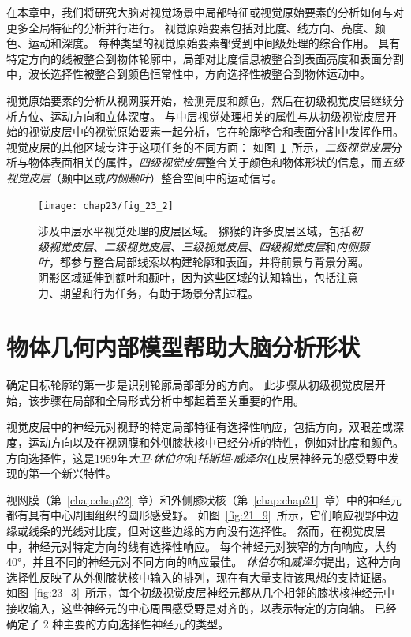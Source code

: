 在本章中，我们将研究大脑对视觉场景中局部特征或视觉原始要素的分析如何与对更多全局特征的分析并行进行。
视觉原始要素包括对比度、线方向、亮度、颜色、运动和深度。
每种类型的视觉原始要素都受到中间级处理的综合作用。
具有特定方向的线被整合到物体轮廓中，局部对比度信息被整合到表面亮度和表面分割中，波长选择性被整合到颜色恒常性中，方向选择性被整合到物体运动中。


视觉原始要素的分析从视网膜开始，检测亮度和颜色，然后在初级视觉皮层继续分析方位、运动方向和立体深度。
与中层视觉处理相关的属性与从初级视觉皮层开始的视觉皮层中的视觉原始要素一起分析，它在轮廓整合和表面分割中发挥作用。
视觉皮层的其他区域专注于这项任务的不同方面：
如图~\ref{fig:23_2}~所示，\textit{二级视觉皮层}分析与物体表面相关的属性，\textit{四级视觉皮层}整合关于颜色和物体形状的信息，而\textit{五级视觉皮层}（颞中区或\textit{内侧颞叶}）整合空间中的运动信号。


\begin{figure}[htbp]
	\centering
	\texttt{[image: chap23/fig\_23\_2]}
	\caption{涉及中层水平视觉处理的皮层区域。
		猕猴的许多皮层区域，包括\textit{初级视觉皮层}、\textit{二级视觉皮层}、\textit{三级视觉皮层}、\textit{四级视觉皮层}和\textit{内侧颞叶}，都参与整合局部线索以构建轮廓和表面，并将前景与背景分离。
		阴影区域延伸到额叶和颞叶，因为这些区域的认知输出，包括注意力、期望和行为任务，有助于场景分割过程。}
	\label{fig:23_2}
\end{figure}



\section{物体几何内部模型帮助大脑分析形状}

确定目标轮廓的第一步是识别轮廓局部部分的方向。
此步骤从初级视觉皮层开始，该步骤在局部和全局形式分析中都起着至关重要的作用。


视觉皮层中的神经元对视野的特定局部特征有选择性响应，包括方向，双眼差或深度，运动方向以及在视网膜和外侧膝状核中已经分析的特性，例如对比度和颜色。 
方向选择性，这是1959年\textit{大卫$\cdot$休伯尔}和\textit{托斯坦$\cdot$威泽尔}在皮层神经元的感受野中发现的第一个新兴特性。


视网膜（第~\ref{chap:chap22}~章）和外侧膝状核（第~\ref{chap:chap21}~章）中的神经元都有具有中心周围组织的圆形感受野。
如图~\ref{fig:21_9}~所示，它们响应视野中边缘或线条的光线对比度，但对这些边缘的方向没有选择性。
然而，在视觉皮层中，神经元对特定方向的线有选择性响应。
每个神经元对狭窄的方向响应，大约40°，并且不同的神经元对不同方向的响应最佳。
\textit{休伯尔}和\textit{威泽尔}提出，这种方向选择性反映了从外侧膝状核中输入的排列，现在有大量支持该思想的支持证据。
如图~\ref{fig:23_3}~所示，每个初级视觉皮层神经元都从几个相邻的膝状核神经元中接收输入，这些神经元的中心周围感受野是对齐的，以表示特定的方向轴。
已经确定了 2 种主要的方向选择性神经元的类型。


